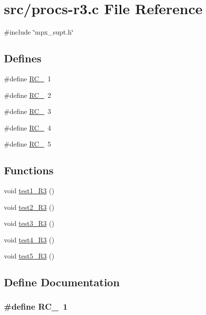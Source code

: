 \hypertarget{procs-r3_8c}{
\section{src/procs-\/r3.c File Reference}
\label{procs-r3_8c}
}
{\ttfamily \#include \char`\"{}mpx\_\-supt.h\char`\"{}}\par
\subsection*{Defines}
\begin{DoxyCompactItemize}
\item 
\#define \hyperlink{procs-r3_8c_a69bb368d802d94815d8480c1196eb868}{RC\_}~1
\item 
\#define \hyperlink{procs-r3_8c_aecb625779f85a782d04475c4fb74ebc5}{RC\_}~2
\item 
\#define \hyperlink{procs-r3_8c_acf180d856b90414b8bed369054fcd763}{RC\_}~3
\item 
\#define \hyperlink{procs-r3_8c_ac76d64b147c7d9537915e51c7dc02bc1}{RC\_}~4
\item 
\#define \hyperlink{procs-r3_8c_acba6a931785dc419ad6337bc9c1a24f8}{RC\_}~5
\end{DoxyCompactItemize}
\subsection*{Functions}
\begin{DoxyCompactItemize}
\item 
void \hyperlink{procs-r3_8c_ae4496e9c01adc7562ce34516c13226a0}{test1\_\-R3} ()
\item 
void \hyperlink{procs-r3_8c_ab61a49e4507b3dba1bfad0cc9510d0a6}{test2\_\-R3} ()
\item 
void \hyperlink{procs-r3_8c_a453a58ecc6482a24bf02e7caf67aa41a}{test3\_\-R3} ()
\item 
void \hyperlink{procs-r3_8c_aaa737ca092fa5d35b33665401852fb7b}{test4\_\-R3} ()
\item 
void \hyperlink{procs-r3_8c_abe909889e9cb85d683914b291867a6e6}{test5\_\-R3} ()
\end{DoxyCompactItemize}


\subsection{Define Documentation}
\hypertarget{procs-r3_8c_a69bb368d802d94815d8480c1196eb868}{
\subsubsection[{RC\_\-1}]{\setlength{\rightskip}{0pt plus 5cm}\#define RC\_~1}}
\label{procs-r3_8c_a69bb368d802d94815d8480c1196eb868}


